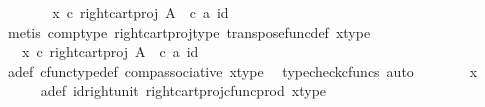 \begin{isabellebody}
\ \ \isamarkupfalse%
\ \isamarkupfalse%
\ {\isachardoublequoteopen}{\isachardot}{\kern0pt}{\isachardot}{\kern0pt}{\isachardot}{\kern0pt}\ {\isacharequal}{\kern0pt}\ {\isacharparenleft}{\kern0pt}x\ {\isasymcirc}\isactrlsub c\ right{\isacharunderscore}{\kern0pt}cart{\isacharunderscore}{\kern0pt}proj\ A\ {\isasymone}{\isacharparenright}{\kern0pt}\ {\isasymcirc}\isactrlsub c\ {\isasymlangle}a{\isacharcomma}{\kern0pt}\ id{\isacharparenleft}{\kern0pt}{\isasymone}{\isacharparenright}{\kern0pt}{\isasymrangle}{\isachardoublequoteclose}\isanewline
\ \ \ \ \isamarkupfalse%
\ {\isacharparenleft}{\kern0pt}metis\ comp{\isacharunderscore}{\kern0pt}type\ right{\isacharunderscore}{\kern0pt}cart{\isacharunderscore}{\kern0pt}proj{\isacharunderscore}{\kern0pt}type\ transpose{\isacharunderscore}{\kern0pt}func{\isacharunderscore}{\kern0pt}def\ x{\isacharunderscore}{\kern0pt}type{}{\isacharparenright}{\kern0pt}\ \isanewline
\ \ \isamarkupfalse%
\ \isamarkupfalse%
\ {\isachardoublequoteopen}{\isachardot}{\kern0pt}{\isachardot}{\kern0pt}{\isachardot}{\kern0pt}\ {\isacharequal}{\kern0pt}\ x\ {\isasymcirc}\isactrlsub c\ {\isacharparenleft}{\kern0pt}right{\isacharunderscore}{\kern0pt}cart{\isacharunderscore}{\kern0pt}proj\ A\ {\isasymone}\ {\isasymcirc}\isactrlsub c\ {\isasymlangle}a{\isacharcomma}{\kern0pt}\ id{\isacharparenleft}{\kern0pt}{\isasymone}{\isacharparenright}{\kern0pt}{\isasymrangle}{\isacharparenright}{\kern0pt}{\isachardoublequoteclose}\isanewline
\ \ \ \ \isamarkupfalse%
\ a{\isacharunderscore}{\kern0pt}def\ cfunc{\isacharunderscore}{\kern0pt}type{\isacharunderscore}{\kern0pt}def\ comp{\isacharunderscore}{\kern0pt}associative\ x{\isacharunderscore}{\kern0pt}type{}\ \isamarkupfalse%
\ {\isacharparenleft}{\kern0pt}typecheck{\isacharunderscore}{\kern0pt}cfuncs{\isacharcomma}{\kern0pt}\ auto{\isacharparenright}{\kern0pt}\isanewline
\ \ \isamarkupfalse%
\ \isamarkupfalse%
\ {\isachardoublequoteopen}{\isachardot}{\kern0pt}{\isachardot}{\kern0pt}{\isachardot}{\kern0pt}\ {\isacharequal}{\kern0pt}\ x{\isachardoublequoteclose}\isanewline
\ \ \ \ \isamarkupfalse%
\ a{\isacharunderscore}{\kern0pt}def\ id{\isacharunderscore}{\kern0pt}right{\isacharunderscore}{\kern0pt}unit{}\ right{\isacharunderscore}{\kern0pt}cart{\isacharunderscore}{\kern0pt}proj{\isacharunderscore}{\kern0pt}cfunc{\isacharunderscore}{\kern0pt}prod\ x{\isacharunderscore}{\kern0pt}type{}\ \isamarkupfalse%

\end{isabellebody}
